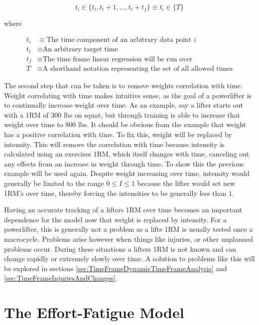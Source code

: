 \begin{equation}
    \label{eq:TimeFrame}
    t_i \in\{ t_t, t_t+1,\dots,t_t+t_f \}
    \equiv t_i \in \{ T \}
\end{equation}
\centerline{where}
\begin{equation*}
    \begin{split}
        t_i &\equiv \text{The time component of an arbitrary data point }i \\
        t_t &\equiv \text{An arbitrary target time} \\
        t_f &\equiv \text{The time frame linear regression will be run over} \\
        T & \equiv \text{A shorthand notation representing the set of all allowed times}
    \end{split}
\end{equation*}

The second step that can be taken is to remove weights correlation with time. Weight correlating with time makes intuitive sense, as the goal of a powerlifter is to continually increase weight over time. As an example, say a lifter starts out with a 1RM of $300$ lbs on squat, but through training is able to increase that weight over time to $800$ lbs. It should be obvious from the example that weight has a positive correlation with time. To fix this, weight will be replaced by intensity. This will remove the correlation with time because intensity is calculated using an exercises 1RM, which itself changes with time, canceling out any effects from an increase in weight through time. To show this the previous example will be used again. Despite weight increasing over time, intensity would generally be limited to the range $0\le I\le 1$ because the lifter would set new 1RM's over time, thereby forcing the intensities to be generally less than $1$.

Having an accurate tracking of a lifters 1RM over time becomes an important dependence for the model now that weight is replaced by intensity. For a powerlifter, this is generally not a problem as a lifts 1RM is usually tested once a macrocycle. Problems arise however when things like injuries, or other unplanned problems occur. During these situations a lifters 1RM is not known and can change rapidly or extremely slowly over time. A solution to problems like this will be explored in sections \ref{sec:TimeFrameDynamicTimeFrameAnalysis} and \ref{sec:TimeFrameInjuriesAndChanges}.


\section{The Effort-Fatigue Model}
\label{sec:PotentialSurfaceEffortFatigueModel}

